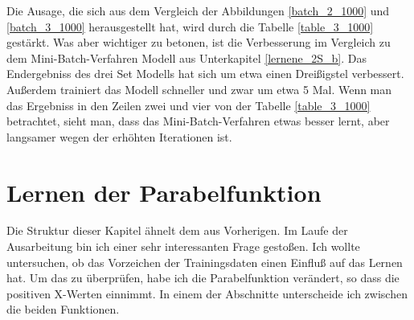 {Die Ausage, die sich aus dem Vergleich der Abbildungen \ref{batch_2_1000} und \ref{batch_3_1000} herausgestellt hat, wird durch die Tabelle \ref{table_3_1000} gestärkt. Was aber wichtiger zu betonen, ist die Verbesserung im Vergleich zu dem Mini-Batch-Verfahren Modell aus Unterkapitel \ref{lernene_2S_b}. Das Endergebniss des drei Set Modells hat sich um etwa einen Dreißigstel verbessert. Außerdem trainiert das Modell schneller und zwar um etwa 5 Mal. Wenn man das Ergebniss in den Zeilen zwei und vier von der Tabelle \ref{table_3_1000} betrachtet, sieht man, dass das Mini-Batch-Verfahren etwas besser lernt, aber langsamer wegen der erhöhten Iterationen ist.

\section{Lernen der Parabelfunktion}

Die Struktur dieser Kapitel ähnelt dem aus Vorherigen. Im Laufe der Ausarbeitung bin ich einer sehr interessanten Frage gestoßen. Ich wollte untersuchen, ob das Vorzeichen der Trainingsdaten einen Einfluß auf das Lernen hat. Um das zu überprüfen, habe ich die Parabelfunktion verändert, so dass die positiven X-Werten einnimmt. In einem der Abschnitte unterscheide ich zwischen die beiden Funktionen.

}
